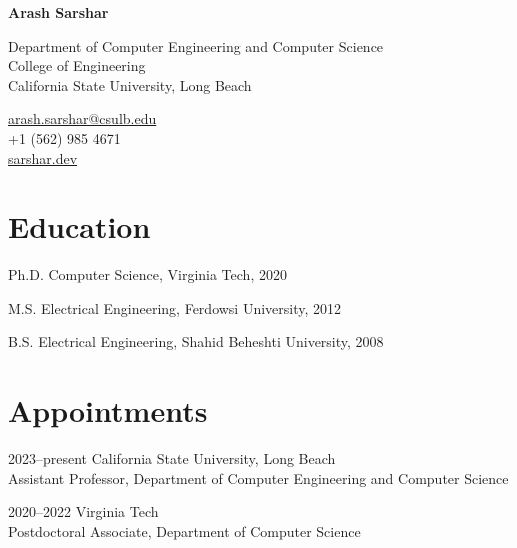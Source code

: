 \documentclass[11pt,letterpaper]{report}
\newcommand{\myname}{Arash Sarshar}
\newcommand{\namefont}[1]{{\normalfont\bfseries\Huge{#1}}}
\begin{document}
    \raggedright{}

    \namefont{\myname}

    \vspace{1em}
    \begin{minipage}[t]{0.700\textwidth}
        Department of Computer Engineering and Computer Science \\
        College of Engineering \\
        California State University, Long Beach
    \end{minipage}
    \begin{minipage}[t]{0.295\textwidth}
        \flushright{}
        \href{mailto:arash.sarshar@csulb.edu}{arash.sarshar@csulb.edu} \\
        +1 (562) 985 4671 \\
        \href{https://sarshar.dev}{sarshar.dev}
    \end{minipage}


    \section*{Education}

    \begin{tablist}

        \item[Ph.D.] \tab{}Computer Science, Virginia Tech, 2020
        \item[M.S.]  \tab{}Electrical Engineering, Ferdowsi University, 2012
        \item[B.S.]  \tab{}Electrical Engineering, Shahid Beheshti University, 2008

    \end{tablist}



    \section*{Appointments}

    \begin{tablist}

    \item[2023--present]       \tab{}California State University, Long Beach \\
                              \tab{}Assistant Professor, Department of Computer Engineering and Computer Science \\

    \item[2020--2022]                \tab{} Virginia Tech\\
                            \tab{}  Postdoctoral Associate, Department of Computer Science

    \end{tablist}
\end{document}
